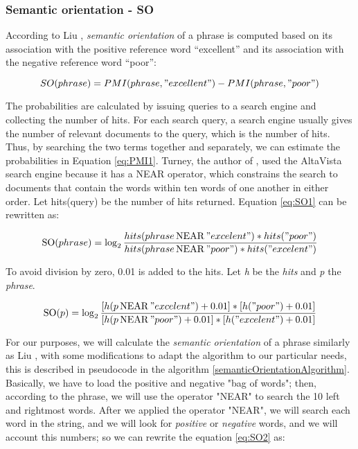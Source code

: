 \subsubsection{Semantic orientation - SO}\label{SO}

According to Liu \cite%
{L2011},  \emph{semantic orientation} of a phrase is computed based on its association with the positive reference word “excellent” and its association with the negative reference word “poor”:

\begin{equation} \label{eq:SO1}
	SO(phrase) = PMI(phrase, "excellent") - PMI(phrase, "poor")
\end{equation}	

The probabilities are calculated by issuing queries to a search engine and collecting the number of hits. For each search query, a search engine usually gives the number of relevant documents to the query, which is the number of hits. Thus, by searching the two terms together and separately, we can estimate the probabilities in Equation \ref{eq:PMI1}. Turney, the author of \cite{T2002}, used the AltaVista search engine because it has a NEAR operator, which constrains the search to documents that contain the words within ten words of one another in either order. Let hits(query) be the number of hits returned. Equation \ref{eq:SO1} can be rewritten as:

\begin{equation} \label{eq:SO2}
\operatorname{SO}(phrase) = \log_{2}\frac{hits(phrase \operatorname{NEAR} "excelent") * hits("poor")}{hits(phrase \operatorname{NEAR} "poor") * hits("excelent")}
\end{equation}

To avoid division by zero, 0.01 is added to the hits. Let \emph{h} be the \emph{hits} and \emph{p} the \emph{phrase}.

\begin{equation} \label{eq:SO3}
\operatorname{SO}(p) = \log_{2}\frac{[ h(p \operatorname{NEAR} "excelent") + 0.01]* [ h("poor")+0.01]}{[ h(p \operatorname{NEAR} "poor") + 0.01] *[ h("excelent")+0.01]}
\end{equation}

For our purposes, we will calculate the \emph{semantic orientation} of a phrase similarly as Liu \cite{L2011}, with some modifications to adapt the algorithm to our particular needs, this is described in pseudocode in the algorithm \ref{semanticOrientationAlgorithm}. Basically, we have to load the positive and negative "bag of words"; then, according to the phrase, we will use the operator "NEAR" to search the 10 left and rightmost words. After we applied the operator "NEAR", we will search each word in the string, and we will look for \emph{positive} or \emph{negative} words, and we will account this numbers; so we can rewrite the equation \ref{eq:SO2} as:

